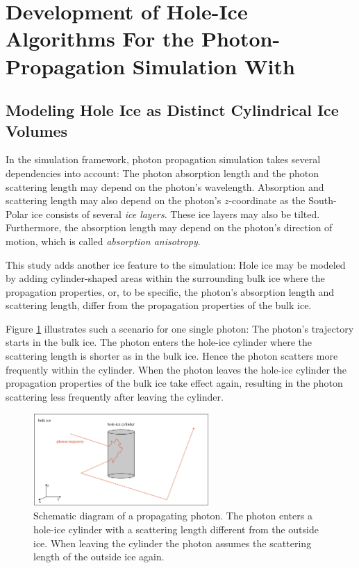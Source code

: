 
\section{Development of Hole-Ice Algorithms For the Photon-Propagation Simulation With \clsim}
\label{sec:methods}

\subsection{Modeling Hole Ice as Distinct Cylindrical Ice Volumes}

In the \icecube simulation framework, photon propagation simulation takes several dependencies into account: The photon absorption length and the photon scattering length may depend on the photon's wavelength. Absorption and scattering length may also depend on the photon's $z$-coordinate as the South-Polar ice consists of several \textit{ice layers}. These ice layers may also be tilted. Furthermore, the absorption length may depend on the photon's direction of motion, which is called \textit{absorption anisotropy}.

This study adds another ice feature to the simulation: Hole ice may be modeled by adding cylinder-shaped areas within the surrounding bulk ice where the propagation properties, or, to be specific, the photon's absorption length and scattering length, differ from the propagation properties of the bulk ice.

Figure \ref{fig:aiw2Thah} illustrates such a scenario for one single photon: The photon's trajectory starts in the bulk ice. The photon enters the hole-ice cylinder where the scattering length is shorter as in the bulk ice. Hence the photon scatters more frequently within the cylinder. When the photon leaves the hole-ice cylinder the propagation properties of the bulk ice take effect again, resulting in the photon scattering less frequently after leaving the cylinder.

\begin{figure}[htb]
  \centering
  \includegraphics[width=0.6\textwidth]{img/hole-ice-as-cylinder-shaped-areas}
  \caption{Schematic diagram of a propagating photon. The photon enters a hole-ice cylinder with a scattering length different from the outside ice. When leaving the cylinder the photon assumes the scattering length of the outside ice again.}
  \label{fig:aiw2Thah}
\end{figure}


